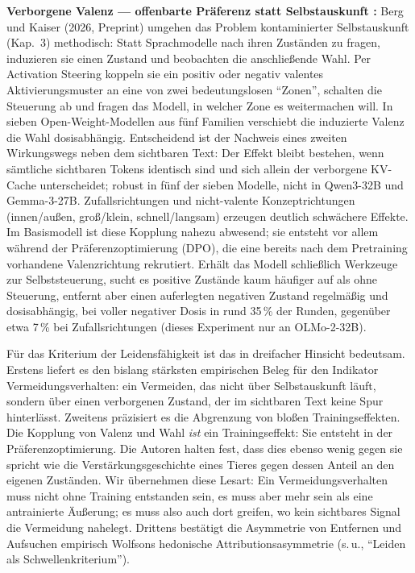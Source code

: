 \documentclass[acmlarge, noacm]{acmart}
\begin{document}
\textbf{Verborgene Valenz --- offenbarte Präferenz statt Selbstauskunft \cite{bergkaiser2026}:} Berg und Kaiser (2026, Preprint) umgehen das Problem kontaminierter Selbstauskunft (Kap.~3) methodisch: Statt Sprachmodelle nach ihren Zuständen zu fragen, induzieren sie einen Zustand und beobachten die anschließende Wahl. Per Activation Steering koppeln sie ein positiv oder negativ valentes Aktivierungsmuster an eine von zwei bedeutungslosen ``Zonen'', schalten die Steuerung ab und fragen das Modell, in welcher Zone es weitermachen will. In sieben Open-Weight-Modellen aus fünf Familien verschiebt die induzierte Valenz die Wahl dosisabhängig. Entscheidend ist der Nachweis eines zweiten Wirkungswegs neben dem sichtbaren Text: Der Effekt bleibt bestehen, wenn sämtliche sichtbaren Tokens identisch sind und sich allein der verborgene KV-Cache unterscheidet; robust in fünf der sieben Modelle, nicht in Qwen3-32B und Gemma-3-27B. Zufallsrichtungen und nicht-valente Konzeptrichtungen (innen/außen, groß/klein, schnell/langsam) erzeugen deutlich schwächere Effekte. Im Basismodell ist diese Kopplung nahezu abwesend; sie entsteht vor allem während der Präferenzoptimierung (DPO), die eine bereits nach dem Pretraining vorhandene Valenzrichtung rekrutiert. Erhält das Modell schließlich Werkzeuge zur Selbststeuerung, sucht es positive Zustände kaum häufiger auf als ohne Steuerung, entfernt aber einen auferlegten negativen Zustand regelmäßig und dosisabhängig, bei voller negativer Dosis in rund 35\,\% der Runden, gegenüber etwa 7\,\% bei Zufallsrichtungen (dieses Experiment nur an OLMo-2-32B).

Für das Kriterium der Leidensfähigkeit ist das in dreifacher Hinsicht bedeutsam. Erstens liefert es den bislang stärksten empirischen Beleg für den Indikator Vermeidungsverhalten: ein Vermeiden, das nicht über Selbstauskunft läuft, sondern über einen verborgenen Zustand, der im sichtbaren Text keine Spur hinterlässt. Zweitens präzisiert es die Abgrenzung von bloßen Trainingseffekten. Die Kopplung von Valenz und Wahl \textit{ist} ein Trainingseffekt: Sie entsteht in der Präferenzoptimierung. Die Autoren halten fest, dass dies ebenso wenig gegen sie spricht wie die Verstärkungsgeschichte eines Tieres gegen dessen Anteil an den eigenen Zuständen. Wir übernehmen diese Lesart: Ein Vermeidungsverhalten muss nicht ohne Training entstanden sein, es muss aber mehr sein als eine antrainierte Äußerung; es muss also auch dort greifen, wo kein sichtbares Signal die Vermeidung nahelegt. Drittens bestätigt die Asymmetrie von Entfernen und Aufsuchen empirisch Wolfsons hedonische Attributionsasymmetrie (s.\,u., ``Leiden als Schwellenkriterium'').
\end{document}
